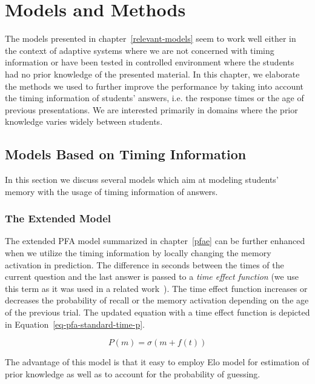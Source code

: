 \chapter{Models and Methods}

The models presented in chapter~\ref{relevant-models} seem to work well either in the context of adaptive systems where we are not concerned with timing information or have been tested in controlled environment where the students had no prior knowledge of the presented material. In this chapter, we elaborate the methods we used to further improve the performance by taking into account the timing information of students' answers, i.e. the response times or the age of previous presentations. We are interested primarily in domains where the prior knowledge varies widely between students.

\section{Models Based on Timing Information}
\label{models-timing}

In this section we discuss several models which aim at modeling students' memory with the usage of timing information of answers.

\subsection{The Extended Model}
\label{pfaet}

The extended PFA model summarized in chapter~\ref{pfae} can be further enhanced when we utilize the timing information by locally changing the memory activation in prediction. The difference in seconds between the times of the current question and the last answer is passed to a \textit{time effect function} (we use this term as it was used in a related work~\cite{Pelanek2015}). The time effect function increases or decreases the probability of recall or the memory activation depending on the age of the previous trial. The updated equation with a time effect function is depicted in Equation~\ref{eq-pfa-standard-time-p}.

\begin{equation} \label{eq-pfa-standard-time-p}
  P(m) = \sigma(m + f(t))
\end{equation}

The advantage of this model is that it easy to employ Elo model for estimation of prior knowledge as well as to account for the probability of guessing.

